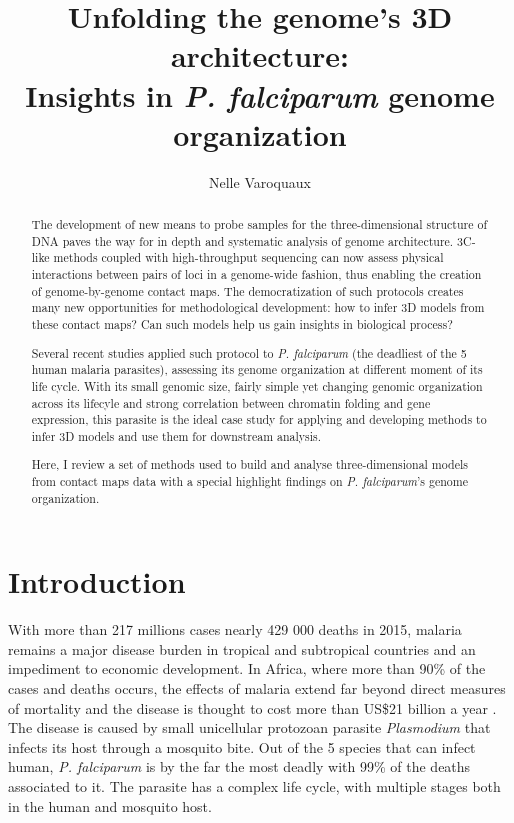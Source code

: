 \documentclass[2columns]{article}
\begin{document}
\title{Unfolding the genome's 3D architecture:\\
  \Large{Insights in {\em P. falciparum} genome organization}}
\author{Nelle Varoquaux}

\maketitle


\begin{abstract}

The development of new means to probe samples for the three-dimensional
structure of DNA paves the way for in depth and systematic analysis of genome
architecture. 3C-like methods coupled with high-throughput sequencing can now
assess physical interactions between pairs of loci in a genome-wide fashion,
thus enabling the creation of genome-by-genome contact maps. The
democratization of such protocols creates many new opportunities for
methodological development: how to infer 3D models from these contact maps?
Can such models help us gain insights in biological process?

Several recent studies applied such protocol to {\em P. falciparum} (the
deadliest of the 5 human malaria parasites), assessing its genome organization
at different moment of its life cycle. With its small genomic size, fairly
simple yet changing genomic organization across its lifecyle and strong
correlation between chromatin folding and gene expression, this parasite is
the ideal case study for applying and developing methods to infer 3D models
and use them for downstream analysis. 

Here, I review a set of methods used to build and analyse three-dimensional
models from contact maps data with a special highlight findings on {\em P.
falciparum}'s genome organization.
\end{abstract}


\section{Introduction}
\label{sec:introduction}

With more than 217 millions cases nearly 429 000 deaths in 2015,  malaria
remains a major disease burden in tropical and subtropical countries and an
impediment to economic development. In Africa, where more than 90\% of the
cases and deaths occurs, the effects of malaria extend far beyond direct
measures of mortality and the disease is thought to cost more than US\$21
billion a year \citep{onwujekwe:do}. The disease is caused by small
unicellular protozoan parasite {\em Plasmodium} that infects its host through
a mosquito bite. Out of the 5 species that can infect human, {\em P.
falciparum} is by the far the most deadly with 99\% of the deaths associated
to it. The parasite has a complex life cycle, with multiple stages both in the
human and mosquito host.
\end{document}

